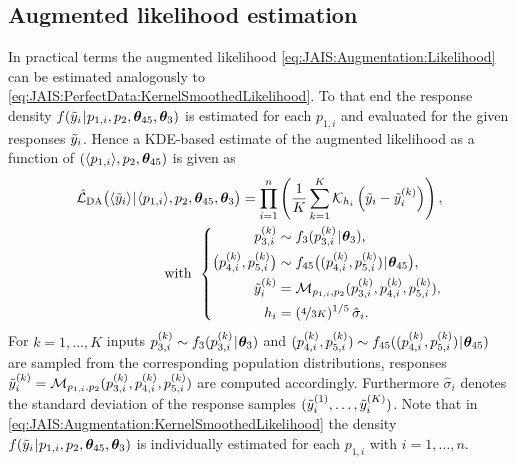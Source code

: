 \subsection{Augmented likelihood estimation}
In practical terms the augmented likelihood \cref{eq:JAIS:Augmentation:Likelihood} can be estimated analogously to \cref{eq:JAIS:PerfectData:KernelSmoothedLikelihood}.
To that end the response density \(f (\tilde{y}_i {\:\!}|{\:\!} p_{1,i},p_2,\bm{\theta}_{45},\bm{\theta}_3)\) is estimated for each \(p_{1,i}\) and evaluated for the given responses \(\tilde{y}_i\).
Hence a KDE-based estimate of the augmented likelihood as a function of \((\langle{p_{1,i}}\rangle,p_2,\bm{\theta}_{45})\) is given as
\begin{gather} \label{eq:JAIS:Augmentation:KernelSmoothedLikelihood}
  \begin{aligned}
  \hat{\mathcal{L}}_{\mathrm{DA}} \big( \langle{\tilde{y}_i}\rangle {\:\!}|{\:\!} \langle{p_{1,i}}\rangle,p_2,\bm{\theta}_{45},\bm{\theta}_3 \big)
  = \prod\limits_{i=1}^n \left( \frac{1}{K} \sum\limits_{k=1}^{K} \mathcal{K}_{h_i} \left( \tilde{y}_i-\tilde{y}_i^{(k)} \right) \right), \\
  \text{with} \;\, \left\{
  \begin{aligned}
    p_{3,i}^{(k)} &\sim f_3 (p_{3,i}^{(k)} {\:\!}|{\:\!} \bm{\theta}_3), \\
    \big( p_{4,i}^{(k)},p_{5,i}^{(k)} \big) &\sim f_{45} \big( (p_{4,i}^{(k)},p_{5,i}^{(k)}) {\:\!}|{\:\!} \bm{\theta}_{45} \big), \\
    \tilde{y}_i^{(k)} &= \mathcal{M}_{p_{1,i},p_2}(p_{3,i}^{(k)},p_{4,i}^{(k)},p_{5,i}^{(k)}), \\
    h_i &= (\nicefrac{4}{3K})^{1/5} \, \hat{\sigma}_i.
  \end{aligned}
  \right.
  \end{aligned}
\end{gather}
For \(k=1,\ldots,K\) inputs \(p_{3,i}^{(k)} \sim f_3 (p_{3,i}^{(k)} {\:\!}|{\:\!} \bm{\theta}_3)\) and \((p_{4,i}^{(k)},p_{5,i}^{(k)}) \sim f_{45}((p_{4,i}^{(k)},p_{5,i}^{(k)}) {\:\!}|{\:\!} \bm{\theta}_{45})\)
are sampled from the corresponding population distributions, responses \(\tilde{y}_i^{(k)} = \mathcal{M}_{p_{1,i},p_2}(p_{3,i}^{(k)},p_{4,i}^{(k)},p_{5,i}^{(k)})\) are computed accordingly.
Furthermore \(\hat{\sigma}_i\) denotes the standard deviation of the response samples \((\tilde{y}_i^{(1)},\ldots,\tilde{y}_i^{(K)})\).
Note that in \cref{eq:JAIS:Augmentation:KernelSmoothedLikelihood} the density \(f(\tilde{y}_i {\:\!}|{\:\!} p_{1,i},p_2,\bm{\theta}_{45}, \bm{\theta}_3)\) is individually estimated for each \(p_{1,i}\) with \(i=1,\ldots,n\).
